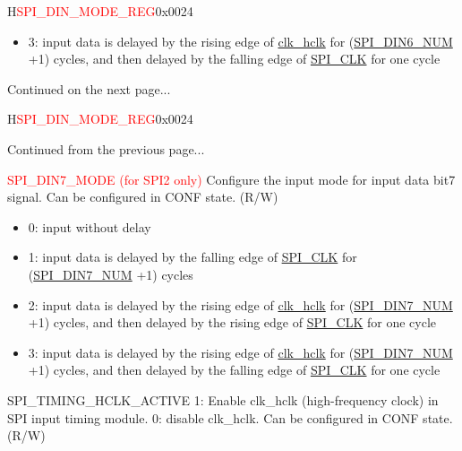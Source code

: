 \begin{register}{H}{\textcolor{red}{SPI\_DIN\_MODE\_REG}}{0x{}0024}
\begin{regdesc}
\begin{reglist}
\begin{itemize}
    \item 3: input data is delayed by the rising edge of \hyperref[clk:clkhclk]{clk\_hclk} for (\hyperref[fielddesc:SPIDIN6NUM]{SPI\_DIN6\_NUM} +1) cycles, and then delayed by the falling edge of \hyperref[clk:SPICLK]{SPI\_CLK} for one cycle
\end{itemize}

\item [Continued on the next page...]
\end{reglist}\end{regdesc}
\end{register}

\addtocounter{Regfloat}{-1}
\begin{register}{H}{\textcolor{red}{SPI\_DIN\_MODE\_REG}}{0x{}0024}
\begin{regdesc}\begin{reglist}
\item [Continued from the previous page...]

\label{fielddesc:SPIDIN7MODE}\item [\textcolor{red}{SPI\_DIN7\_MODE (for SPI2 only)}]Configure the input mode for input data bit7 signal. Can be configured in CONF state. (R/W)

\begin{itemize}
    \item 0: input without delay
    \item 1: input data is delayed by the falling edge of \hyperref[clk:SPICLK]{SPI\_CLK} for (\hyperref[fielddesc:SPIDIN7NUM]{SPI\_DIN7\_NUM} +1) cycles

    \item 2: input data is delayed by the rising edge of \hyperref[clk:clkhclk]{clk\_hclk} for (\hyperref[fielddesc:SPIDIN7NUM]{SPI\_DIN7\_NUM} +1) cycles, and then delayed by the rising edge of \hyperref[clk:SPICLK]{SPI\_CLK} for one cycle

    \item 3: input data is delayed by the rising edge of \hyperref[clk:clkhclk]{clk\_hclk} for (\hyperref[fielddesc:SPIDIN7NUM]{SPI\_DIN7\_NUM} +1) cycles, and then delayed by the falling edge of \hyperref[clk:SPICLK]{SPI\_CLK} for one cycle
\end{itemize}

\label{fielddesc:SPITIMINGHCLKACTIVE}\item [SPI\_TIMING\_HCLK\_ACTIVE] 1: Enable clk\_hclk (high-frequency clock) in SPI input timing module. 0: disable clk\_hclk. Can be configured in CONF state. (R/W)
\end{reglist}\end{regdesc}
\end{register}



